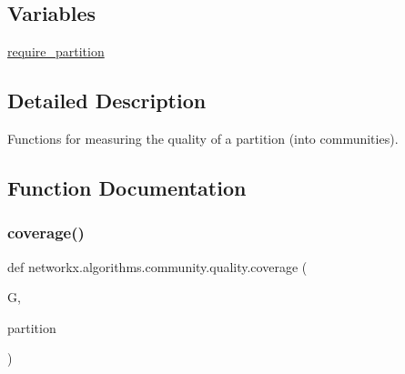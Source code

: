 \subsection*{Variables}
\begin{DoxyCompactItemize}
\item 
\hyperlink{namespacenetworkx_1_1algorithms_1_1community_1_1quality_ab7ddd6a98c5019ab29f5ded31bd2df81}{require\+\_\+partition}
\end{DoxyCompactItemize}


\subsection{Detailed Description}
\begin{DoxyVerb}Functions for measuring the quality of a partition (into
communities).\end{DoxyVerb}
 

\subsection{Function Documentation}
\mbox{\label{namespacenetworkx_1_1algorithms_1_1community_1_1quality_ab0eedeeade4582947d360c52f29f29c3}} 
\subsubsection{\texorpdfstring{coverage()}{coverage()}}
{\footnotesize\ttfamily def networkx.\+algorithms.\+community.\+quality.\+coverage (\begin{DoxyParamCaption}\item[{}]{G,  }\item[{}]{partition }\end{DoxyParamCaption})}

